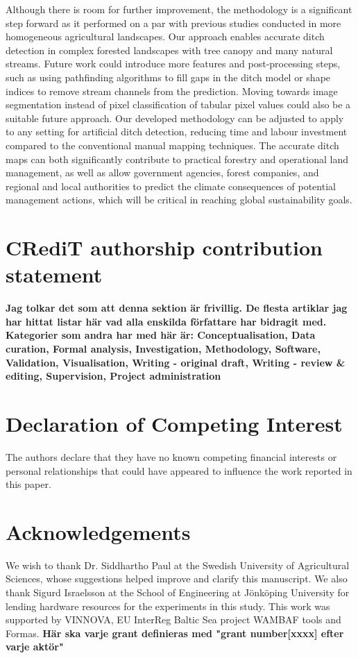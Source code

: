 \documentclass[11pt, review]{elsarticle} %
\begin{document}
Although there is room for further improvement, the methodology is a significant step forward as it performed on a par with previous studies conducted in more homogeneous agricultural landscapes. Our approach enables accurate ditch detection in complex forested landscapes with tree canopy and many natural streams. Future work could introduce more features and post-processing steps, such as using pathfinding algorithms to fill gaps in the ditch model or shape indices to remove stream channels from the prediction. Moving towards image segmentation instead of pixel classification of tabular pixel values could also be a suitable future approach. Our developed methodology can be adjusted to apply to any setting for artificial ditch detection, reducing time and labour investment compared to the conventional manual mapping techniques. The accurate ditch maps can both significantly contribute to practical forestry and operational land management, as well as allow government agencies, forest companies, and regional and local authorities to predict the climate consequences of potential management actions, which will be critical in reaching global sustainability goals.

\section*{CRediT authorship contribution statement}

\textbf{Jag tolkar det som att denna sektion är frivillig. De flesta artiklar jag har hittat listar här vad alla enskilda författare har bidragit med. Kategorier som andra har med här är: Conceptualisation, Data curation, Formal analysis, Investigation, Methodology, Software, Validation, Visualisation, Writing - original draft, Writing - review & editing, Supervision, Project administration}

\section*{Declaration of Competing Interest}

The authors declare that they have no known competing financial interests or personal relationships that could have appeared to influence the work reported in this paper.

\section*{Acknowledgements}
We wish to thank Dr. Siddhartho Paul at the Swedish University of Agricultural Sciences, whose suggestions helped improve and clarify this manuscript. We also thank Sigurd Israelsson at the School of Engineering at J\"onk\"oping University for lending hardware resources for the experiments in this study. This work was supported by VINNOVA, EU InterReg Baltic Sea project WAMBAF tools and Formas. \textbf{ Här ska varje grant definieras med "grant number[xxxx] efter varje aktör"}



\end{document}
